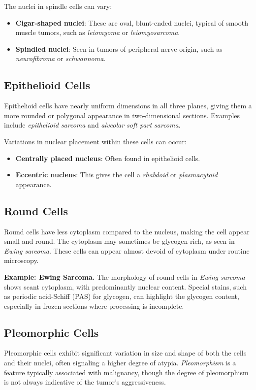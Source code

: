 The nuclei in spindle cells can vary:
\begin{itemize}
    \item \textbf{Cigar-shaped nuclei}: These are oval, blunt-ended nuclei, typical of smooth muscle tumors, such as \emph{leiomyoma} or \emph{leiomyosarcoma}.
    \item \textbf{Spindled nuclei}: Seen in tumors of peripheral nerve origin, such as \emph{neurofibroma} or \emph{schwannoma}.
\end{itemize}

\subsection{Epithelioid Cells}
Epithelioid cells have nearly uniform dimensions in all three planes, giving them a more rounded or polygonal appearance in two-dimensional sections. Examples include \emph{epithelioid sarcoma} and \emph{alveolar soft part sarcoma}.

Variations in nuclear placement within these cells can occur:
\begin{itemize}
    \item \textbf{Centrally placed nucleus}: Often found in epithelioid cells.
    \item \textbf{Eccentric nucleus}: This gives the cell a \emph{rhabdoid} or \emph{plasmacytoid} appearance.
\end{itemize}

\subsection{Round Cells}
Round cells have less cytoplasm compared to the nucleus, making the cell appear small and round. The cytoplasm may sometimes be glycogen-rich, as seen in \emph{Ewing sarcoma}. These cells can appear almost devoid of cytoplasm under routine microscopy.

\textbf{Example: Ewing Sarcoma.} The morphology of round cells in \emph{Ewing sarcoma} shows scant cytoplasm, with predominantly nuclear content. Special stains, such as periodic acid-Schiff (PAS) for glycogen, can highlight the glycogen content, especially in frozen sections where processing is incomplete.

\subsection{Pleomorphic Cells}
Pleomorphic cells exhibit significant variation in size and shape of both the cells and their nuclei, often signaling a higher degree of atypia. \emph{Pleomorphism} is a feature typically associated with malignancy, though the degree of pleomorphism is not always indicative of the tumor's aggressiveness.

